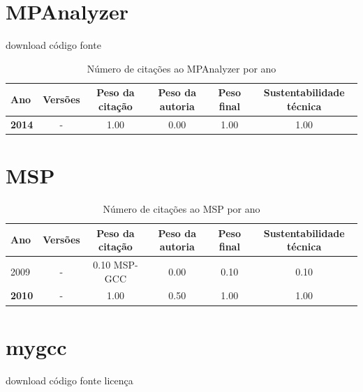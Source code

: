 \section{MPAnalyzer}
\checkmark download
\checkmark código fonte


\begin{table}[H]
\caption{Número de citações ao MPAnalyzer por ano}
\centering
\begin{tabular}{| l | c | c | c | c | c |}
  \hline
  Ano & Versões & Peso da citação & Peso da autoria & Peso final & Sustentabilidade técnica \\
  \hline
            {\bf 2014}
          &
          -
          &
          1.00
          &
          0.00
          &
          1.00
          &
            {\color{blue} 1.00}
          \\
\hline
\end{tabular}
\end{table}



\section{MSP}


\begin{table}[H]
\caption{Número de citações ao MSP por ano}
\centering
\begin{tabular}{| l | c | c | c | c | c |}
  \hline
  Ano & Versões & Peso da citação & Peso da autoria & Peso final & Sustentabilidade técnica \\
  \hline
            2009
          &
          -
          &
          0.10
            {\tiny MSP-GCC}
          &
          0.00
          &
          0.10
          &
            {\color{red} 0.10}
          \\
\hline
            {\bf 2010}
          &
          -
          &
          1.00
          &
          0.50
          &
          1.00
          &
            {\color{blue} 1.00}
          \\
\hline
\end{tabular}
\end{table}



\section{mygcc}
\checkmark download
\checkmark código fonte
\checkmark licença


